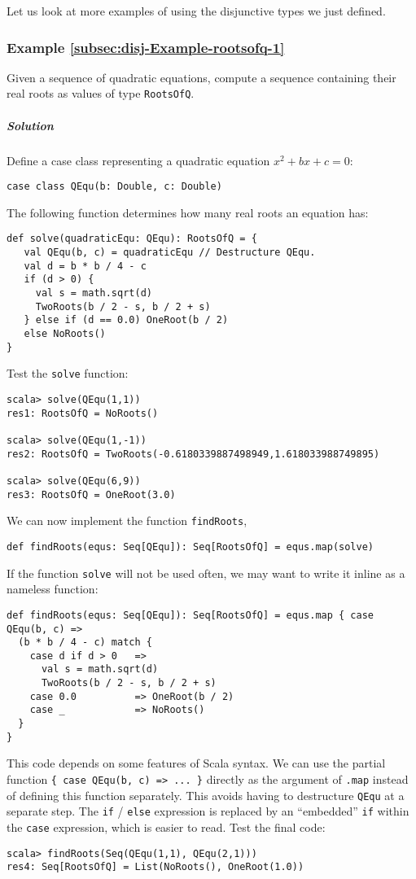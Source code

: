 Let us look at more examples of using the disjunctive types we just
defined.

\subsubsection{Example \label{subsec:disj-Example-rootsofq-1}\ref{subsec:disj-Example-rootsofq-1}}

Given a sequence of quadratic equations, compute a sequence containing
their real roots as values of type \lstinline!RootsOfQ!.

\subparagraph{Solution}

Define a case class representing a quadratic equation $x^{2}+bx+c=0$:
\begin{lstlisting}
case class QEqu(b: Double, c: Double)
\end{lstlisting}
The following function determines how many real roots an equation
has:
\begin{lstlisting}
def solve(quadraticEqu: QEqu): RootsOfQ = {
   val QEqu(b, c) = quadraticEqu // Destructure QEqu.
   val d = b * b / 4 - c
   if (d > 0) {
     val s = math.sqrt(d)
     TwoRoots(b / 2 - s, b / 2 + s)
   } else if (d == 0.0) OneRoot(b / 2)
   else NoRoots()
}
\end{lstlisting}
Test the \lstinline!solve! function:
\begin{lstlisting}
scala> solve(QEqu(1,1))
res1: RootsOfQ = NoRoots()

scala> solve(QEqu(1,-1))
res2: RootsOfQ = TwoRoots(-0.6180339887498949,1.618033988749895) 

scala> solve(QEqu(6,9))
res3: RootsOfQ = OneRoot(3.0) 
\end{lstlisting}
We can now implement the function \lstinline!findRoots!,
\begin{lstlisting}
def findRoots(equs: Seq[QEqu]): Seq[RootsOfQ] = equs.map(solve)
\end{lstlisting}
If the function \lstinline!solve! will not be used often, we may
want to write it inline as a nameless function:
\begin{lstlisting}
def findRoots(equs: Seq[QEqu]): Seq[RootsOfQ] = equs.map { case QEqu(b, c) =>
  (b * b / 4 - c) match {
    case d if d > 0   =>
      val s = math.sqrt(d)
      TwoRoots(b / 2 - s, b / 2 + s)
    case 0.0          => OneRoot(b / 2)
    case _            => NoRoots()
  }
}
\end{lstlisting}
This code depends on some features of Scala syntax. We can use the
partial function \lstinline!{ case QEqu(b, c) => ... }! directly
as the argument of \lstinline!.map! instead of defining this function
separately. This avoids having to destructure \lstinline!QEqu! at
a separate step. The \lstinline!if! / \lstinline!else! expression
is replaced by an ``embedded'' \lstinline!if!
within the \lstinline!case! expression, which is easier to read.
Test the final code:
\begin{lstlisting}
scala> findRoots(Seq(QEqu(1,1), QEqu(2,1)))
res4: Seq[RootsOfQ] = List(NoRoots(), OneRoot(1.0)) 
\end{lstlisting}


